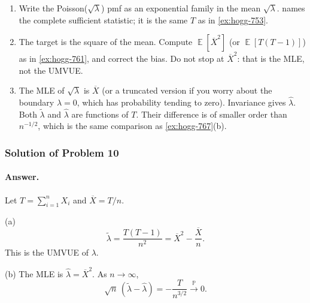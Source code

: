\documentclass[11pt,a4paper]{article}
\DeclareMathOperator{\E}{\mathbb{E}}
\DeclareMathOperator{\Pbb}{\mathbb{P}}
\begin{document}
\begin{remark}
\label{rem:p10-hints}
\begin{enumerate}[label=\textup{(\arabic*)}]
    \item
    Write the Poisson(\(\sqrt{\lambda}\)) pmf as an exponential family in the mean \(\sqrt{\lambda}\).  names the complete sufficient statistic; it is the same \(T\) as in \cref{ex:hogg-753}.
    \item
    The target is the square of the mean. Compute \(\E[\overline{X}^2]\) (or \(\E[T(T-1)]\)) as in \cref{ex:hogg-761}, and correct the bias. Do not stop at \(\overline{X}^2\): that is the MLE, not the UMVUE.
    \item
    The MLE of \(\sqrt{\lambda}\) is \(\overline{X}\) (or a truncated version if you worry about the boundary \(\lambda=0\), which has probability tending to zero). Invariance gives \(\hat\lambda\). Both \(\tilde\lambda\) and \(\hat\lambda\) are functions of \(T\). Their difference is of smaller order than \(n^{-1/2}\), which is the same comparison as \cref{ex:hogg-767}(b).
\end{enumerate}
\end{remark}

\subsubsection{Solution of Problem 10}

\paragraph{Answer.}

Let \(T=\sum_{i=1}^{n}X_i\) and \(\overline{X}=T/n\).

(a)
\[
\tilde{\lambda}
=
\frac{T(T-1)}{n^{2}}
=
\overline{X}^{2}-\frac{\overline{X}}{n}.
\]
This is the UMVUE of \(\lambda\).

(b) The MLE is \(\hat{\lambda}=\overline{X}^{2}\). As \(n\to\infty\),
\[
\sqrt{n}\,(\tilde{\lambda}-\hat{\lambda})
=
-\frac{T}{n^{3/2}}
\xrightarrow{\Pbb}
0.
\]
\end{document}
